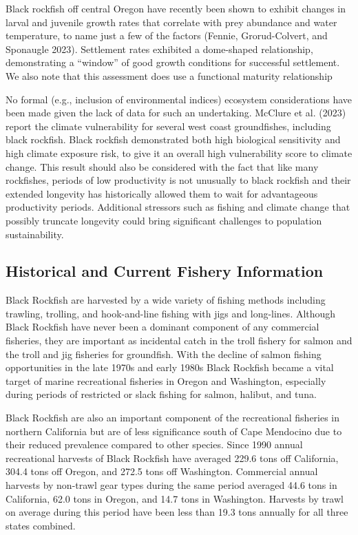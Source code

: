 \documentclass[11pt,
  english,
  letterpaper,
]{article}
\begin{document}
Black rockfish off central Oregon have recently been shown to exhibit changes in larval and juvenile growth rates that correlate with prey abundance and water temperature, to name just a few of the factors (Fennie, Grorud-Colvert, and Sponaugle 2023). Settlement rates exhibited a dome-shaped relationship, demonstrating a ``window'' of good growth conditions for successful settlement. We also note that this assessment does use a functional maturity relationship

No formal (e.g., inclusion of environmental indices) ecosystem considerations have been made given the lack of data for such an undertaking. McClure et al. (2023) report the climate vulnerability for several west coast groundfishes, including black rockfish. Black rockfish demonstrated both high biological sensitivity and high climate exposure risk, to give it an overall high vulnerability score to climate change. This result should also be considered with the fact that like many rockfishes, periods of low productivity is not unusually to black rockfish and their extended longevity has historically allowed them to wait for advantageous productivity periods. Additional stressors such as fishing and climate change that possibly truncate longevity could bring significant challenges to population sustainability.

\hypertarget{historical-and-current-fishery-information}{%
\subsection{Historical and Current Fishery Information}\label{historical-and-current-fishery-information}}

Black Rockfish are harvested by a wide variety of fishing methods including trawling, trolling, and hook-and-line fishing with jigs and long-lines. Although Black Rockfish have never been a dominant component of any commercial fisheries, they are important as incidental catch in the troll fishery for salmon and the troll and jig fisheries for groundfish. With the decline of salmon fishing opportunities in the late 1970s and early 1980s Black Rockfish became a vital target of marine recreational fisheries in Oregon and Washington, especially during periods of restricted or slack fishing for salmon, halibut, and tuna.

Black Rockfish are also an important component of the recreational fisheries in northern California but are of less significance south of Cape Mendocino due to their reduced prevalence compared to other species. Since 1990 annual recreational harvests of Black Rockfish have averaged 229.6 tons off California, 304.4 tons off Oregon, and 272.5 tons off Washington. Commercial annual harvests by non-trawl gear types during the same period averaged 44.6 tons in California, 62.0 tons in Oregon, and 14.7 tons in Washington. Harvests by trawl on average during this period have been less than 19.3 tons annually for all three states combined.
\end{document}
